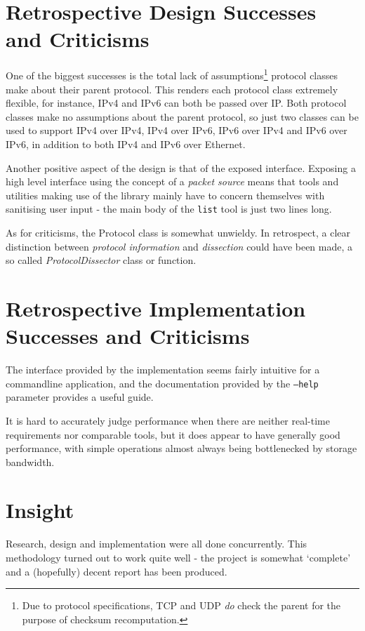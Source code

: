 \documentclass[10pt,a4paper,notitlepage]{report}
\begin{document}
\section{Retrospective Design Successes and Criticisms}
One of the biggest successes is the total lack of assumptions\footnote{Due to protocol specifications, TCP and UDP \emph{do} check the parent for the purpose of checksum recomputation.} protocol classes make about their parent protocol. This renders each protocol class extremely flexible, for instance, IPv4 and IPv6 can both be passed over IP. Both protocol classes make no assumptions about the parent protocol, so just two classes can be used to support IPv4 over IPv4, IPv4 over IPv6, IPv6 over IPv4 and IPv6 over IPv6, in addition to both IPv4 and IPv6 over Ethernet.

Another positive aspect of the design is that of the exposed interface. Exposing a high level interface using the concept of a \emph{packet source} means that tools and utilities making use of the library mainly have to concern themselves with sanitising user input - the main body of the \texttt{list} tool is just two lines long.

As for criticisms, the Protocol class is somewhat unwieldy. In retrospect, a clear distinction between \emph{protocol information} and \emph{dissection} could have been made, a so called \emph{ProtocolDissector} class or function.

\section{Retrospective Implementation Successes and Criticisms}
The interface provided by the implementation seems fairly intuitive for a commandline application, and the documentation provided by the \texttt{--help} parameter provides a useful guide.

It is hard to accurately judge performance when there are neither real-time requirements nor comparable tools, but it does appear to have generally good performance, with simple operations almost always being bottlenecked by storage bandwidth.

\section{Insight}
Research, design and implementation were all done concurrently. This methodology turned out to work quite well - the project is somewhat `complete' and a (hopefully) decent report has been produced.
\end{document}
